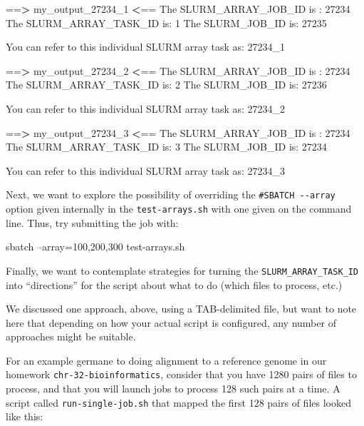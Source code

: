 \documentclass[]{krantz}
\makeatletter
\newenvironment{Shaded}{\begin{snugshade}}{\end{snugshade}}
\newcommand{\ExtensionTok}[1]{#1}
\newcommand{\NormalTok}[1]{#1}
\newcommand{\OperatorTok}[1]{\textcolor[rgb]{0.43,0.43,0.43}{\textbf{#1}}}
\newenvironment{kframe}{%
\medskip{}
\setlength{\fboxsep}{.8em}
 \def\at@end@of@kframe{}%
 \ifinner\ifhmode%
  \def\at@end@of@kframe{\end{minipage}}%
  \begin{minipage}{\columnwidth}%
 \fi\fi%
 \def\FrameCommand##1{\hskip\@totalleftmargin \hskip-\fboxsep
 \colorbox{shadecolor}{##1}\hskip-\fboxsep
     \hskip-\linewidth \hskip-\@totalleftmargin \hskip\columnwidth}%
 \MakeFramed {\advance\hsize-\width
   \@totalleftmargin\z@ \linewidth\hsize
   \@setminipage}}%
 {\par\unskip\endMakeFramed%
 \at@end@of@kframe}
\renewenvironment{Shaded}{\begin{kframe}}{\end{kframe}}
\makeatother
\begin{document}
\begin{Shaded}
\begin{Highlighting}[]
\NormalTok{==}\OperatorTok{>} \ExtensionTok{my_output_27234_1} \OperatorTok{<}\NormalTok{==}
\ExtensionTok{The}\NormalTok{ SLURM_ARRAY_JOB_ID is : 27234}
\ExtensionTok{The}\NormalTok{ SLURM_ARRAY_TASK_ID is: 1}
\ExtensionTok{The}\NormalTok{ SLURM_JOB_ID is: 27235}

\ExtensionTok{You}\NormalTok{ can refer to this individual SLURM array task as: 27234_1}


\NormalTok{==}\OperatorTok{>} \ExtensionTok{my_output_27234_2} \OperatorTok{<}\NormalTok{==}
\ExtensionTok{The}\NormalTok{ SLURM_ARRAY_JOB_ID is : 27234}
\ExtensionTok{The}\NormalTok{ SLURM_ARRAY_TASK_ID is: 2}
\ExtensionTok{The}\NormalTok{ SLURM_JOB_ID is: 27236}

\ExtensionTok{You}\NormalTok{ can refer to this individual SLURM array task as: 27234_2}


\NormalTok{==}\OperatorTok{>} \ExtensionTok{my_output_27234_3} \OperatorTok{<}\NormalTok{==}
\ExtensionTok{The}\NormalTok{ SLURM_ARRAY_JOB_ID is : 27234}
\ExtensionTok{The}\NormalTok{ SLURM_ARRAY_TASK_ID is: 3}
\ExtensionTok{The}\NormalTok{ SLURM_JOB_ID is: 27234}

\ExtensionTok{You}\NormalTok{ can refer to this individual SLURM array task as: 27234_3}
\end{Highlighting}
\end{Shaded}

Next, we want to explore the possibility of overriding the \texttt{\#SBATCH\ -\/-array} option
given internally in the \texttt{test-arrays.sh} with one given on the command line. Thus,
try submitting the job with:

\begin{Shaded}
\begin{Highlighting}[]
\ExtensionTok{sbatch}\NormalTok{ --array=100,200,300 test-arrays.sh}
\end{Highlighting}
\end{Shaded}

Finally, we want to contemplate strategies for turning the \texttt{SLURM\_ARRAY\_TASK\_ID}
into ``directions'' for the script about what to do (which files to process, etc.)

We discussed one approach, above, using a TAB-delimited file, but want to note here
that depending on how your actual script is configured, any number of approaches
might be suitable.

For an example germane to doing alignment to a reference genome in our
homework \texttt{chr-32-bioinformatics}, consider that you have 1280 pairs of files
to process, and that you will launch jobs to process 128 such pairs at a time.
A script called \texttt{run-single-job.sh} that mapped the first 128 pairs of files
looked like this:
\end{document}
